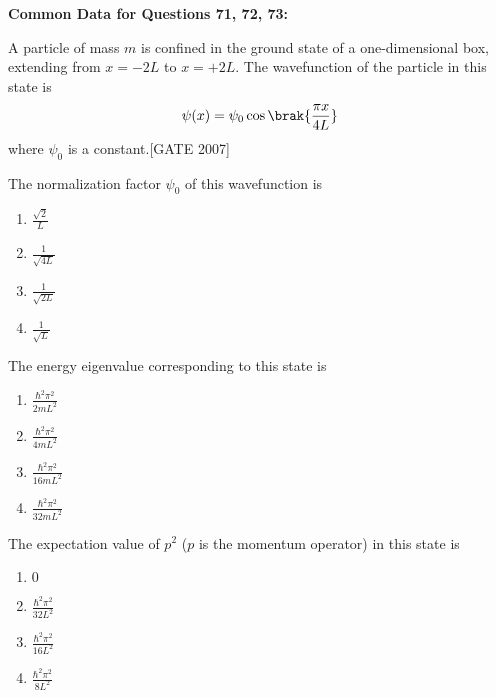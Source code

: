 \textbf{Common Data for Questions 71, 72, 73:}

A particle of mass $m$ is confined in the ground state of a one-dimensional box, extending from $x = -2L$ to $x = +2L$. The wavefunction of the particle in this state is  
\begin{align*}
    \psi(x) = \psi_0 \cos \brak{ \frac{\pi x}{4L}}
\end{align*}
where $\psi_0$ is a constant.\hfill{[GATE 2007]}


    \item  The normalization factor $\psi_0$ of this wavefunction is
    \begin{multicols}{4}
    \begin{enumerate}
        \item $\frac{\sqrt{2}}{L}$
        \item $\frac{1}{\sqrt{4L}}$
        \item $\frac{1}{\sqrt{2L}}$
        \item $\frac{1}{\sqrt{L}}$
    \end{enumerate}
    \end{multicols}

    \item  The energy eigenvalue corresponding to this state is
    \begin{multicols}{4}
    \begin{enumerate}
        \item $\frac{\hbar^2 \pi^2}{2mL^2}$
        \item $\frac{\hbar^2 \pi^2}{4mL^2}$
        \item $\frac{\hbar^2 \pi^2}{16mL^2}$
        \item $\frac{\hbar^2 \pi^2}{32mL^2}$
    \end{enumerate}
    \end{multicols}

    \item  The expectation value of $p^2$ ($p$ is the momentum operator) in this state is
    \begin{multicols}{2}
    \begin{enumerate}
        \item $0$\\
        \item $\frac{\hbar^2 \pi^2}{32L^2}$
\\        \item $\frac{\hbar^2 \pi^2}{16L^2}$
        \item $\frac{\hbar^2 \pi^2}{8L^2}$
    \end{enumerate}
    \end{multicols}


